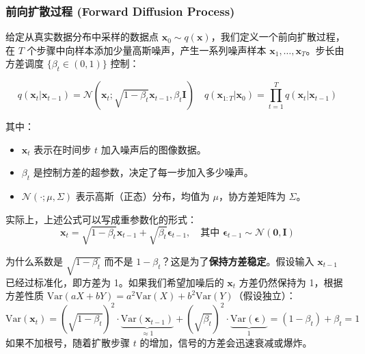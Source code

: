 \documentclass[zihao=-4, fontset=windows]{ctexart}
\begin{document}
\subsubsection{前向扩散过程 (Forward Diffusion Process)}

给定从真实数据分布中采样的数据点 $\mathbf{x}_{0} \sim q(\mathbf{x})$，我们定义一个前向扩散过程，在 $T$ 个步骤中向样本添加少量高斯噪声，产生一系列噪声样本 $\mathbf{x}_{1}, \dots, \mathbf{x}_{T}$。步长由方差调度 $\{\beta_{t} \in(0,1)\}$ 控制：

\begin{equation}
q(\mathbf{x}_{t} | \mathbf{x}_{t-1}) = \mathcal{N}(\mathbf{x}_{t} ; \sqrt{1-\beta_{t}} \mathbf{x}_{t-1}, \beta_{t} \mathbf{I}) \quad q(\mathbf{x}_{1: T} | \mathbf{x}_{0}) = \prod_{t=1}^{T} q(\mathbf{x}_{t} | \mathbf{x}_{t-1})
\end{equation}

其中：
\begin{itemize}
    \item $\mathbf{x}_{t}$ 表示在时间步 $t$ 加入噪声后的图像数据。
    \item $\beta_{t}$ 是控制方差的超参数，决定了每一步加入多少噪声。
    \item $\mathcal{N}(\cdot; \mu, \Sigma)$ 表示高斯（正态）分布，均值为 $\mu$，协方差矩阵为 $\Sigma$。
\end{itemize}

实际上，上述公式可以写成重参数化的形式：
\begin{equation}
\mathbf{x}_{t} = \sqrt{1-\beta_{t}}\mathbf{x}_{t-1} + \sqrt{\beta_{t}}\boldsymbol{\epsilon}_{t-1}, \quad \text{其中 } \boldsymbol{\epsilon}_{t-1} \sim \mathcal{N}(\mathbf{0}, \mathbf{I})
\end{equation}

\begin{note}[关于系数根号的解释]
    为什么系数是 $\sqrt{1-\beta_t}$ 而不是 $1-\beta_t$？这是为了\textbf{保持方差稳定}。假设输入 $\mathbf{x}_{t-1}$ 已经过标准化，即方差为 1。如果我们希望加噪后的 $\mathbf{x}_t$ 方差仍然保持为 1，根据方差性质 $\text{Var}(aX + bY) = a^2\text{Var}(X) + b^2\text{Var}(Y)$（假设独立）：
    \begin{equation}
        \text{Var}(\mathbf{x}_t) = (\sqrt{1-\beta_t})^2 \cdot \underbrace{\text{Var}(\mathbf{x}_{t-1})}_{\approx 1} + (\sqrt{\beta_t})^2 \cdot \underbrace{\text{Var}(\boldsymbol{\epsilon})}_{1} = (1-\beta_t) + \beta_t = 1
    \end{equation}
    如果不加根号，随着扩散步骤 $t$ 的增加，信号的方差会迅速衰减或爆炸。
\end{note}
\end{document}
